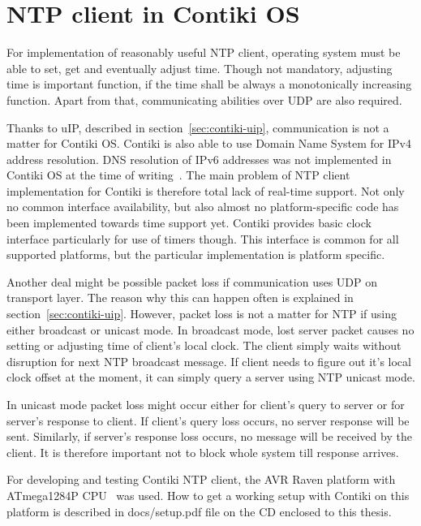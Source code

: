 
\chapter{NTP client in Contiki OS}
For implementation of reasonably useful NTP client,
operating system must be able to set, get
and eventually adjust time.
Though not mandatory, adjusting time is important function,
if the time shall be always a monotonically increasing function.
Apart from that, communicating abilities over UDP are also required.

Thanks to uIP, described in section~\ref{sec:contiki-uip}, communication is
not a matter for Contiki OS.
Contiki is also able to use Domain Name System for IPv4 address resolution.
DNS resolution of IPv6 addresses was not implemented in Contiki OS
at the time of writing~\cite{contiki-docs}.
The main problem of NTP client implementation for Contiki is therefore total
lack of real-time support.
Not only no common interface availability, but also
almost no platform-specific code has been implemented towards time support yet.
Contiki provides basic clock interface particularly for use of timers though.
This interface is common for all supported platforms,
but the particular implementation is platform specific.

Another deal might be possible packet loss if communication uses UDP on transport layer.
The reason why this can happen often is explained in section~\ref{sec:contiki-uip}.
However, packet loss is not a matter for NTP if using either broadcast or unicast mode.
In broadcast mode, lost server packet causes no setting or adjusting time of client's
local clock.
The client simply waits without disruption for next NTP broadcast message.
If client needs to figure out it's local clock offset at the moment,
it can simply query a server using NTP unicast mode.

In unicast mode packet loss might occur either for client's query to server
or for server's response to client.
If client's query loss occurs, no server response will be sent.
Similarly, if server's response loss occurs, no message will be received by the client.
It is therefore important not to block whole system till response arrives.

For developing and testing Contiki NTP client,
the AVR Raven platform with ATmega1284P CPU~\cite{avr-datasheet} was used.
How to get a working setup with Contiki on this platform is described in
docs/setup.pdf file on the CD enclosed to this thesis.








